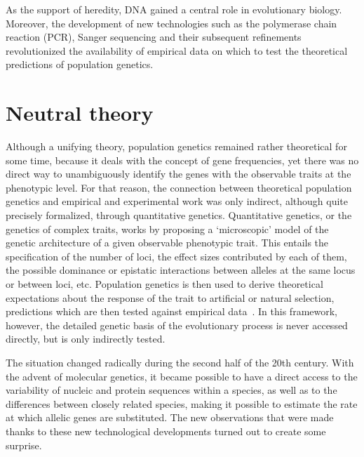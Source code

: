 As the support of heredity, \acrshort{DNA} gained a central role in evolutionary biology.
Moreover, the development of new technologies such as the polymerase chain reaction (PCR), Sanger sequencing and their subsequent refinements revolutionized the availability of empirical data on which to test the theoretical predictions of population genetics.


\section{Neutral theory}

Although a unifying theory, population genetics remained rather theoretical for some time, because it deals with the concept of gene frequencies, yet there was no direct way to unambiguously identify the genes with the observable traits at the phenotypic level.
For that reason, the connection between theoretical population genetics and empirical and experimental work was only indirect, although quite precisely formalized, through quantitative genetics.
Quantitative genetics, or the genetics of complex traits, works by proposing a ‘microscopic’ model of the genetic architecture of a given observable phenotypic trait.
This entails the specification of the number of loci, the effect sizes contributed by each of them, the possible dominance or epistatic interactions between alleles at the same locus or between loci, etc.
Population genetics is then used to derive theoretical expectations about the response of the trait to artificial or natural selection, predictions which are then tested against empirical data~\citep{Lande1976,Lande1980,Lande1983}.
In this framework, however, the detailed genetic basis of the evolutionary process is never accessed directly, but is only indirectly tested.

The situation changed radically during the second half of the 20th century.
With the advent of molecular genetics, it became possible to have a direct access to the variability of nucleic and protein sequences within a species, as well as to the differences between closely related species, making it possible to estimate the rate at which allelic genes are substituted.
The new observations that were made thanks to these new technological developments turned out to create some surprise.

